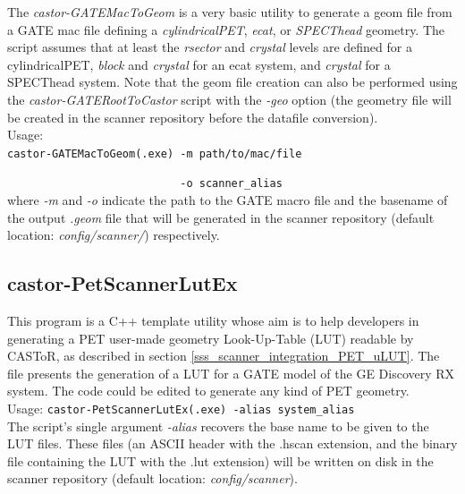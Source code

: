 \documentclass[a4paper, 11pt]{article}
\begin{document}
\clearpage

The \textit{castor-GATEMacToGeom} is a very basic utility to generate a geom file from a GATE\cite{GATE} mac file defining a \textit{cylindricalPET}, \textit{ecat}, or \textit{SPECThead} geometry. The script assumes that at least the \textit{rsector} and \textit{crystal} levels are defined for a cylindricalPET, \textit{block} and \textit{crystal} for an ecat system, and \textit{crystal} for a SPECThead system. Note that the geom file creation can also be performed using the \textit{castor-GATERootToCastor} script with the \textit{-geo} option (the geometry file will be created in the scanner repository before the datafile conversion).\\

Usage:\\
  
\verb|castor-GATEMacToGeom(.exe) -m path/to/mac/file|

\verb|                           -o scanner_alias|\\

where \textit{-m} and \textit{-o} indicate the path to the GATE macro file and the basename of the output \textit{.geom} file that will be generated
in the scanner repository (default location: \textit{config/scanner/}) respectively.


\subsection{castor-PetScannerLutEx}
\label{ss_utilities_scriptLUT}

This program is a C++ template utility whose aim is to help developers in generating a PET user-made geometry Look-Up-Table (LUT) readable
by CASToR, as described in section \ref{sss_scanner_integration_PET_uLUT}. The file presents the generation of a LUT for a GATE model of
the GE Discovery RX system. The code could be edited to generate any kind of PET geometry.\\

Usage:
\verb|castor-PetScannerLutEx(.exe) -alias system_alias|\\

The script's single argument \textit{-alias} recovers the base name to be given to the LUT files. These files (an ASCII header with the .hscan
extension, and the binary file containing the LUT with the .lut extension) will be written on disk in the scanner repository (default
location: \textit{config/scanner}).
\end{document}
